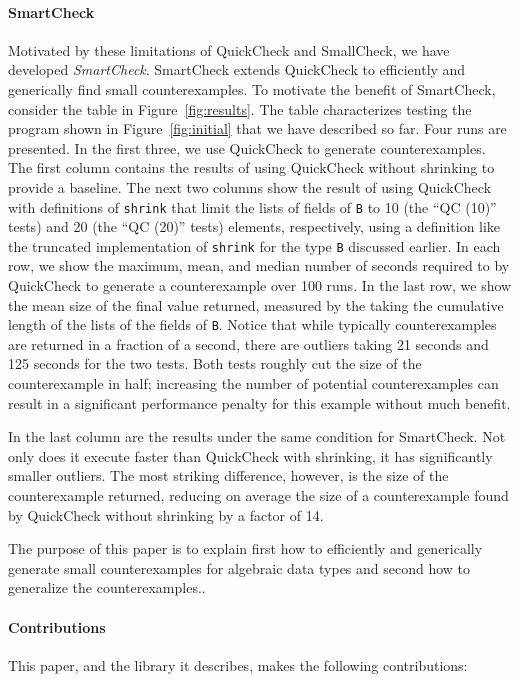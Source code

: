 \documentclass[9pt]{sigplanconf}
\newcommand{\ttp}[1]{\texttt{#1}}
\begin{document}
\paragraph{SmartCheck}
Motivated by these limitations of QuickCheck and SmallCheck, we have developed
\emph{SmartCheck}.  SmartCheck extends QuickCheck to efficiently and generically
find small counterexamples.  To motivate the benefit of SmartCheck, consider the
table in Figure~\ref{fig:results}.  The table characterizes testing the program
shown in Figure~\ref{fig:initial} that we have described so far.  Four runs are
presented.  In the first three, we use QuickCheck to generate counterexamples.
The first column contains the results of using QuickCheck without shrinking to
provide a baseline.  The next two columns show the result of using QuickCheck
with definitions of \ttp{shrink} that limit the lists of fields of \ttp{B} to 10
(the ``QC (10)'' tests) and 20 (the ``QC (20)'' tests) elements, respectively,
using a definition like the truncated implementation of \ttp{shrink} for the
type \ttp{B} discussed earlier.  In each row, we show the maximum, mean, and
median number of seconds required to by QuickCheck to generate a counterexample
over 100 runs.  In the last row, we show the mean size of the final value
returned, measured by the taking the cumulative length of the lists of the
fields of \ttp{B}.  Notice that while typically counterexamples are returned in
a fraction of a second, there are outliers taking 21 seconds and 125 seconds for
the two tests.  Both tests roughly cut the size of the counterexample in half;
increasing the number of potential counterexamples can result in a significant
performance penalty for this example without much benefit.

In the last column are the results under the same condition for SmartCheck.  Not
only does it execute faster than QuickCheck with shrinking, it has significantly
smaller outliers.  The most striking difference, however, is the size of the
counterexample returned, reducing on average the size of a counterexample found
by QuickCheck without shrinking by a factor of 14.

The purpose of this paper is to explain first how to efficiently and generically
generate small counterexamples for algebraic data types and second how to
generalize the counterexamples..

\paragraph{Contributions}
This paper, and the library it describes, makes the following contributions:
\end{document}
